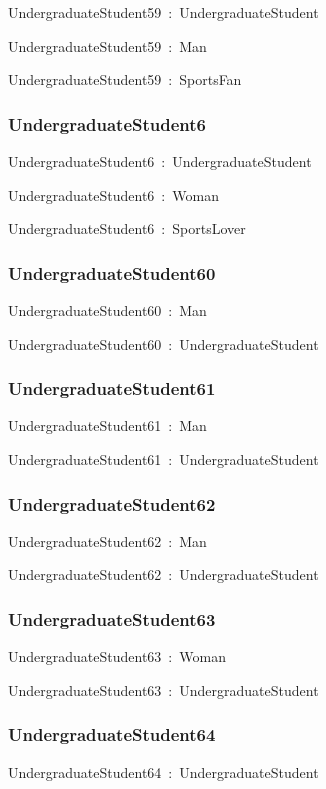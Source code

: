 \documentclass{article}
\begin{document}
UndergraduateStudent59~:~UndergraduateStudent

UndergraduateStudent59~:~Man

UndergraduateStudent59~:~SportsFan

\subsubsection*{UndergraduateStudent6}

UndergraduateStudent6~:~UndergraduateStudent

UndergraduateStudent6~:~Woman

UndergraduateStudent6~:~SportsLover

\subsubsection*{UndergraduateStudent60}

UndergraduateStudent60~:~Man

UndergraduateStudent60~:~UndergraduateStudent

\subsubsection*{UndergraduateStudent61}

UndergraduateStudent61~:~Man

UndergraduateStudent61~:~UndergraduateStudent

\subsubsection*{UndergraduateStudent62}

UndergraduateStudent62~:~Man

UndergraduateStudent62~:~UndergraduateStudent

\subsubsection*{UndergraduateStudent63}

UndergraduateStudent63~:~Woman

UndergraduateStudent63~:~UndergraduateStudent

\subsubsection*{UndergraduateStudent64}

UndergraduateStudent64~:~UndergraduateStudent
\end{document}
